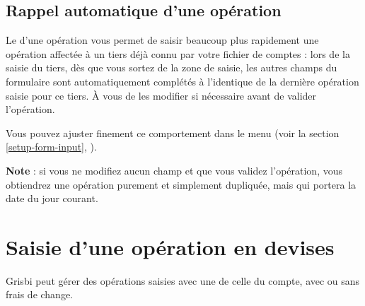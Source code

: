 \subsection{Rappel automatique d'une opération\label{transactions-new-recall}}

Le  d'une opération vous permet de saisir beaucoup plus rapidement une opération affectée à un tiers déjà connu par votre fichier de comptes : lors de la saisie du tiers, dès que vous sortez de la zone de saisie, les autres champs du formulaire sont automatiquement complétés à l'identique de la dernière opération saisie pour ce tiers. À vous de les modifier si nécessaire avant de valider l'opération.  

Vous pouvez ajuster finement ce comportement dans le menu  (voir la section \vref{setup-form-input}, ).

\textbf{Note} : si vous ne modifiez aucun champ et que vous validez l'opération, vous obtiendrez une opération purement et simplement dupliquée, mais qui portera la date du jour courant.


\section{Saisie d'une opération en devises\label{transactions-currencies}}


Grisbi peut gérer des opérations saisies avec une  de celle du compte, avec ou sans frais de change.

